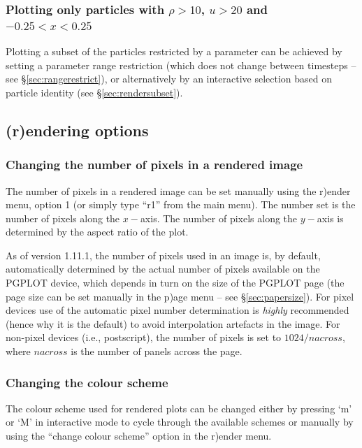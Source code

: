 \documentclass[a4paper,10pt]{article}
\begin{document}
\subsubsection{ Plotting only particles with $\rho > 10$, $u > 20$ and $-0.25 < x < 0.25$}
 Plotting a subset of the particles restricted by a parameter can be achieved by setting a parameter range restriction (which does not change between timesteps -- see \S\ref{sec:rangerestrict}), or alternatively by an interactive selection based on particle identity (see \S\ref{sec:rendersubset}).


\subsection{(r)endering options}
\subsubsection{ Changing the number of pixels in a rendered image}
 The number of pixels in a rendered image can be set manually using the r)ender menu, option 1 (or simply type ``r1'' from the main menu). The number set is the number of pixels along the $x-$axis. The number of pixels along the $y-$axis is determined by the aspect ratio of the plot.

 As of version 1.11.1, the number of pixels used in an image is, by default, automatically determined by the actual number of pixels available on the PGPLOT device, which depends in turn on the size of the PGPLOT page (the page size can be set manually in the p)age menu -- see \S\ref{sec:papersize}). For pixel devices use of the automatic pixel number determination is \emph{highly} recommended (hence why it is the default) to avoid interpolation artefacts in the image. For non-pixel devices (i.e., postscript), the number of pixels is set to $1024/nacross$, where $nacross$ is the number of panels across the page. 

\subsubsection{ Changing the colour scheme}
 The colour scheme used for rendered plots can be changed either by pressing `m' or `M' in interactive mode to cycle through the available schemes or manually by using the ``change colour scheme'' option in the r)ender menu.
\end{document}
